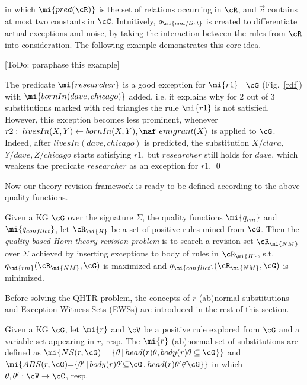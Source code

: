 in which $\mi{pred(\cR)}$ is the set of relations occurring in $\cR$, and $\vec{c}$ contains at most two constants in $\cC$. Intuitively, $q_{\mi{conflict}}$ is created to differentiate actual exceptions and noise, by taking the interaction between the rules from $\cR$ into consideration. The following example demonstrates this core idea.

[ToDo: paraphase this example]

\begin{example} 
The predicate $\mi{researcher}$ is a good exception for $\mi{r1}$ \wrt\ $\cG$ (Fig.~\ref{rdf}) with $\mi{bornIn(dave,chicago)}$ added, i.e. it explains why for 2 out of 3 substitutions marked with red triangles the rule $\mi{r1}$ is not satisfied. However, this exception becomes less prominent, whenever 
$r2:\; livesIn(X,Y)\leftarrow bornIn(X,Y),\naf\ emigrant(X)$ is applied to $\cG$. Indeed, after $livesIn(dave,chicago)$ is predicted, the substitution $X/clara$, $Y/dave,Z/chicago$ starts satisfying $r1$, but $researcher$ still holds for $dave$, which weakens the predicate $researcher$ as an exception for $r1$. \qed
\end{example}

Now our theory revision framework is ready to be defined according to the above quality functions.

\begin{definition} \label{def:qhtr}
Given a KG $\cG$ over the signature $\Sigma$, the quality functions $\mi{q_{rm}}$ and $\mi{q_{conflict}}$, let $\cR_{\mi{H}}$ be a set of positive rules mined from $\cG$. Then the \emph{quality-based Horn theory revision problem} is to search a revision set $\cR_{\mi{NM}}$ over $\Sigma$ achieved by inserting exceptions to body of rules in $\cR_{\mi{H}}$, s.t. $q_{\mi{rm}}(\cR_{\mi{NM}},\cG)$ is maximized and $q_{\mi{conflict}}(\cR_{\mi{NM}},\cG)$ is minimized.
\end{definition}

Before solving the QHTR problem, the concepts of $r$-(ab)normal substitutions and Exception Witness Sets (EWSs) are introduced in the rest of this section.

\begin{definition}\label{sec:rulelearn}
Given a KG $\cG$, let $\mi{r}$ and $\cV$ be a positive rule explored from $\cG$ and a variable set appearing in $r$, resp. The $\mi{r}$-(ab)normal set of substitutions are defined as $\mi{NS(r, \cG)=\{\theta\, |\, head(r)\theta,body(r)\theta \subseteq \cG\}}$ and $\mi{ABS(r, \cG){=}\{\theta'\, |\, body(r)\theta' {\subseteq} \cG\,{,}\,head(r)\theta' {\not \in} \cG\}}$ in which $\theta,\theta':\cV \rightarrow \cC$, resp.
\end{definition}

